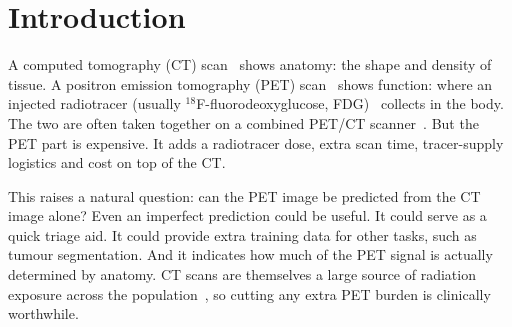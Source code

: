 \documentclass[11pt,a4paper]{article}
\begin{document}
\section{Introduction}
\label{sec:intro}

A computed tomography (CT) scan~\parencite{hounsfield1973ct} shows anatomy: the shape and
density of tissue. A positron emission tomography (PET) scan~\parencite{phelps1975pet} shows
function: where an injected radiotracer (usually $^{18}$F-fluorodeoxyglucose,
FDG)~\parencite{gambhir2002pet} collects in the body. The two are often taken together
on a combined PET/CT scanner~\parencite{beyer2000petct}. But the PET part is expensive. It adds
a radiotracer dose, extra scan time, tracer-supply logistics and cost on top of the CT.

This raises a natural question: can the PET image be predicted from the CT image alone? Even an
imperfect prediction could be useful. It could serve as a quick triage aid. It could provide
extra training data for other tasks, such as tumour segmentation. And it indicates how much of
the PET signal is actually determined by anatomy. CT scans are themselves a large source of
radiation exposure across the population~\parencite{brennerhall2007ctdose}, so cutting any
extra PET burden is clinically worthwhile.
\end{document}
